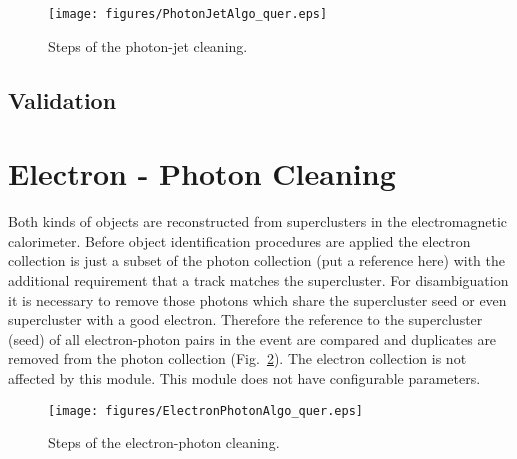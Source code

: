 \documentclass{cmspaper}
\begin{document}

\begin{figure}[hbt]
\begin{center}
\texttt{[image: figures/PhotonJetAlgo\_quer.eps]}
\caption{Steps of the photon-jet cleaning.}
\label{fig:PJCleaning}
\end{center}
\end{figure}

\subsection{Validation}


\section{Electron - Photon Cleaning}
Both kinds of objects are reconstructed from superclusters in the
electromagnetic calorimeter. Before object identification procedures are applied
the electron collection is just a subset of the photon collection (put a
reference here) with the additional requirement that a track matches the
supercluster. For disambiguation it is necessary to remove those photons which
share the supercluster seed or even supercluster with a good electron.
Therefore the reference to the supercluster (seed) of all electron-photon pairs
in the event are compared and duplicates are removed from the photon collection
(Fig.~\ref{fig:EPCleaning}). The electron collection is not affected by this
module. This module does not have configurable parameters.

\begin{figure}[hbt]
\begin{center}
\texttt{[image: figures/ElectronPhotonAlgo\_quer.eps]}
\caption{Steps of the electron-photon cleaning.}
\label{fig:EPCleaning}
\end{center}
\end{figure}
\end{document}
